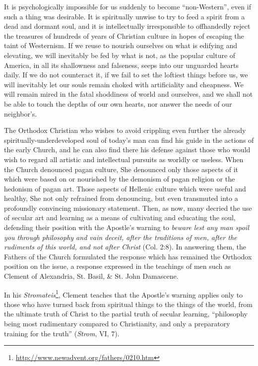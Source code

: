 It is psychologically impossible for us suddenly to become “non-Western”, even if such a thing was desirable. It is spiritually unwise to try to feed a spirit from a dead and dormant soul, and it is intellectually irresponsible to offhandedly reject the treasures of hundreds of years of Christian culture in hopes of escaping the taint of Westernism. If we reuse to nourish ourselves on what is edifying and elevating, we will inevitably be fed by what is not, as the popular culture of America, in all its shallowness and falseness, seeps into our unguarded hearts daily. If we do not counteract it, if we fail to set the loftiest things before us, we will inevitably let our souls remain choked with artificiality and cheapness. We will remain mired in the fatal shoddiness of world and ourselves, and we shall not be able to touch the depths of our own hearts, nor answer the needs of our neighbor's.

The Orthodox Christian who wishes to avoid crippling even further the already spiritually-underdeveloped soul of today's man can find his guide in the actions of the early Church, and he can also find there his defense against those who would wish to regard all artistic and intellectual pursuits as worldly or useless. When the Church denounced pagan culture, She denounced only those aspects of it which were based on or nourished by the demonism of pagan religion or the hedonism of pagan art. Those aspects of Hellenic culture which were useful and healthy, She not only refrained from denouncing, but even transmuted into a profoundly convincing missionary statement. Then, as now, many decried the use of secular art and learning as a means of cultivating and educating the soul, defending their position with the Apostle's warning to \emph{beware lest any man spoil you through philosophy and vain deceit, after the traditions of men, after the rudiments of this world, and not after Christ} (Col. 2:8). In answering them, the Fathers of the Church formulated the response which has remained the Orthodox position on the issue, a response expressed in the teachings of men such as Clement of Alexandria, St. Basil, \& St. John Damascene.

In his \emph{Stromateis}\footnote{\url{http://www.newadvent.org/fathers/0210.htm}}, Clement teaches that the Apostle's warning applies only to those who have turned back from spiritual things to the things of the world, from the ultimate truth of Christ to the partial truth of secular learning, “philosophy being most rudimentary compared to Christianity, and only a preparatory training for the truth” (\emph{Strom}, VI, 7).

